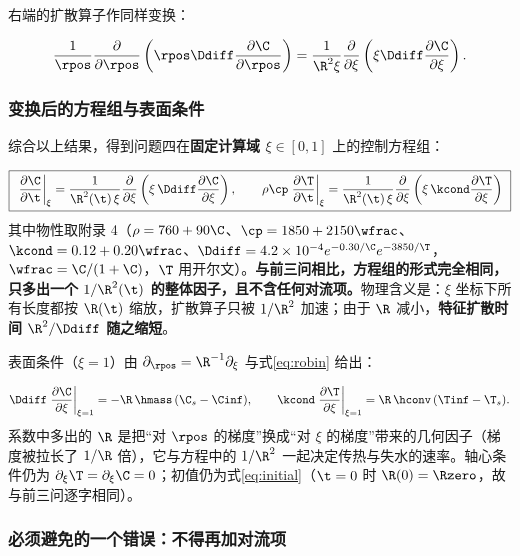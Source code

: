 右端的扩散算子作同样变换：

\begin{equation}
\frac{1}{\rpos}\frac{\partial}{\partial \rpos}\left(\rpos\Ddiff\frac{\partial \C}{\partial \rpos}\right)
=\frac{1}{{\R}^2\xi}\frac{\partial}{\partial \xi}\left(\xi\Ddiff\frac{\partial \C}{\partial \xi}\right).
\end{equation}

\subsubsection{变换后的方程组与表面条件}

综合以上结果，得到问题四在\textbf{固定计算域 $\xi\in[0,1]$} 上的控制方程组：

\begin{equation}
\boxed{\
\left.\frac{\partial \C}{\partial \t}\right|_{\xi}=\frac{1}{{\R}^2(\t)\,\xi}\frac{\partial}{\partial \xi}\left(\xi\,\Ddiff\frac{\partial \C}{\partial \xi}\right),
\qquad
\rho\cp\left.\frac{\partial \T}{\partial \t}\right|_{\xi}=\frac{1}{{\R}^2(\t)\,\xi}\frac{\partial}{\partial \xi}\left(\xi\,\kcond\frac{\partial \T}{\partial \xi}\right)
\ }
\label{eq:q4system}
\end{equation}
其中物性取附录 4（$\rho=760+90\C$、$\cp=1850+2150\wfrac$、$\kcond=0.12+0.20\wfrac$、$\Ddiff=4.2\times10^{-4}e^{-0.30/\C}e^{-3850/\T}$，$\wfrac=\C/(1+\C)$，$\T$ 用开尔文）。\textbf{与前三问相比，方程组的形式完全相同，只多出一个 $1/{\R}^2(\t)$ 的整体因子，且不含任何对流项。}物理含义是：$\xi$ 坐标下所有长度都按 $\R(\t)$ 缩放，扩散算子只被 $1/{\R}^2$ 加速；由于 $\R$ 减小，\textbf{特征扩散时间 ${\R}^2/\Ddiff$ 随之缩短}。

表面条件（$\xi=1$）由 $\partial_\rpos={\R}^{-1}\partial_\xi$ 与式\eqref{eq:robin} 给出：

\begin{equation}
\Ddiff\left.\frac{\partial \C}{\partial \xi}\right|_{\xi=1}=-\R\,\hmass\,({\C}_s-\Cinf),
\qquad
\kcond\left.\frac{\partial \T}{\partial \xi}\right|_{\xi=1}=\R\,\hconv\,(\Tinf-{\T}_s).
\label{eq:q4bc}
\end{equation}
系数中多出的 $\R$ 是把``对 $\rpos$ 的梯度''换成``对 $\xi$ 的梯度''带来的几何因子（梯度被拉长了 $1/\R$ 倍），它与方程中的 $1/{\R}^2$ 一起决定传热与失水的速率。轴心条件仍为 $\partial_\xi\T=\partial_\xi\C=0$；初值仍为式\eqref{eq:initial}（$\t=0$ 时 $\R(0)=\Rzero$，故与前三问逐字相同）。

\subsubsection{必须避免的一个错误：不得再加对流项}

